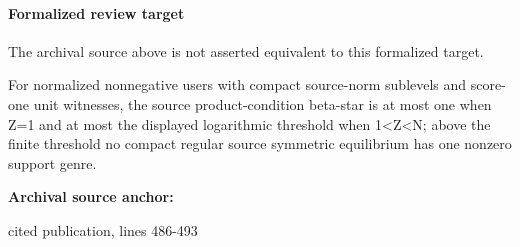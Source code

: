 \documentclass[10pt]{article}
\begin{document}
\paragraph{Formalized review target}
The archival source above is not asserted equivalent to this formalized target.
\begin{ReviewVerbatim}
For normalized nonnegative users with compact source-norm sublevels and score-one unit witnesses, the source product-condition beta-star is at most one when Z=1 and at most the displayed logarithmic threshold when 1<Z<N; above the finite threshold no compact regular source symmetric equilibrium has one nonzero support genre.
\end{ReviewVerbatim}

\textbf{Archival source anchor:} {\footnotesize\raggedright cited publication, lines 486-\allowbreak{}493\par}
\end{document}
